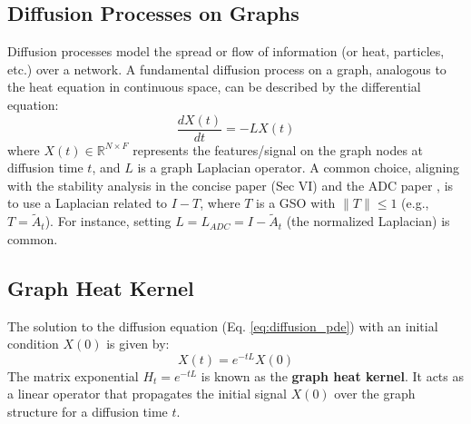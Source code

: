 \subsection{Diffusion Processes on Graphs}
Diffusion processes model the spread or flow of information (or heat, particles, etc.) over a network. A fundamental diffusion process on a graph, analogous to the heat equation in continuous space, can be described by the differential equation:
\begin{equation}
    \frac{dX(t)}{dt} = -L X(t)
    \label{eq:diffusion_pde}
\end{equation}
where $X(t) \in \mathbb{R}^{N \times F}$ represents the features/signal on the graph nodes at diffusion time $t$, and $L$ is a graph Laplacian operator. A common choice, aligning with the stability analysis in the concise paper (Sec VI) and the ADC paper \cite{Zhao2021ADC}, is to use a Laplacian related to $I - T$, where $T$ is a GSO with $\|T\| \le 1$ (e.g., $T = \tilde{A}_t$). For instance, setting $L = L_{ADC} = I - \tilde{A}_t$ (the normalized Laplacian) is common.

\subsection{Graph Heat Kernel}
The solution to the diffusion equation (Eq. \ref{eq:diffusion_pde}) with an initial condition $X(0)$ is given by:
\begin{equation}
    X(t) = e^{-tL} X(0)
    \label{eq:diffusion_solution}
\end{equation}
The matrix exponential $H_t = e^{-tL}$ is known as the \textbf{graph heat kernel}. It acts as a linear operator that propagates the initial signal $X(0)$ over the graph structure for a diffusion time $t$.

